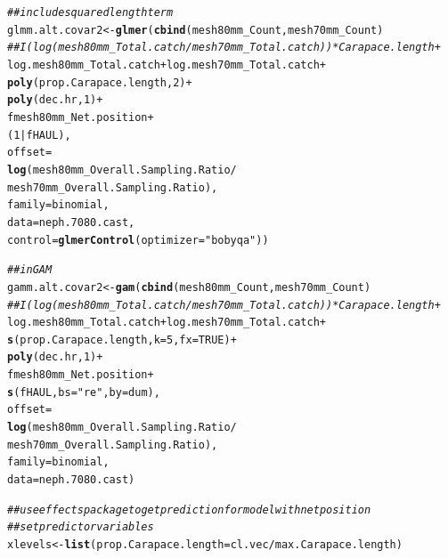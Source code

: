 \documentclass[12pt]{article}\usepackage[]{graphicx}\usepackage[]{color}
\makeatletter
\newcommand{\hlnum}[1]{\textcolor[rgb]{0.686,0.059,0.569}{#1}}%
\newcommand{\hlstr}[1]{\textcolor[rgb]{0.192,0.494,0.8}{#1}}%
\newcommand{\hlcom}[1]{\textcolor[rgb]{0.678,0.584,0.686}{\textit{#1}}}%
\newcommand{\hlopt}[1]{\textcolor[rgb]{0,0,0}{#1}}%
\newcommand{\hlstd}[1]{\textcolor[rgb]{0.345,0.345,0.345}{#1}}%
\newcommand{\hlkwb}[1]{\textcolor[rgb]{0.69,0.353,0.396}{#1}}%
\newcommand{\hlkwc}[1]{\textcolor[rgb]{0.333,0.667,0.333}{#1}}%
\newcommand{\hlkwd}[1]{\textcolor[rgb]{0.737,0.353,0.396}{\textbf{#1}}}%
\newenvironment{kframe}{%
 \def\at@end@of@kframe{}%
 \ifinner\ifhmode%
  \def\at@end@of@kframe{\end{minipage}}%
  \begin{minipage}{\columnwidth}%
 \fi\fi%
 \def\FrameCommand##1{\hskip\@totalleftmargin \hskip-\fboxsep
 \colorbox{shadecolor}{##1}\hskip-\fboxsep
     \hskip-\linewidth \hskip-\@totalleftmargin \hskip\columnwidth}%
 \MakeFramed {\advance\hsize-\width
   \@totalleftmargin\z@ \linewidth\hsize
   \@setminipage}}%
 {\par\unskip\endMakeFramed%
 \at@end@of@kframe}
\newenvironment{knitrout}{}{} %
\makeatother
\begin{document}
\begin{knitrout}
\begin{kframe}
\begin{alltt}
\hlcom{## include squared length term}
\hlstd{glmm.alt.covar2} \hlkwb{<-} \hlkwd{glmer}\hlstd{(}\hlkwd{cbind}\hlstd{(mesh80mm_Count, mesh70mm_Count)} \hlopt{~}
                         \hlcom{##I(log(mesh80mm_Total.catch / mesh70mm_Total.catch)) * Carapace.length +}
                         \hlstd{log.mesh80mm_Total.catch} \hlopt{+} \hlstd{log.mesh70mm_Total.catch} \hlopt{+}
                         \hlkwd{poly}\hlstd{(prop.Carapace.length,} \hlnum{2}\hlstd{)} \hlopt{+}
                         \hlkwd{poly}\hlstd{(dec.hr,} \hlnum{1}\hlstd{)} \hlopt{+}
                         \hlstd{fmesh80mm_Net.position} \hlopt{+}
                         \hlstd{(}\hlnum{1} \hlopt{|} \hlstd{fHAUL),}
                         \hlkwc{offset} \hlstd{=}
                         \hlkwd{log}\hlstd{(mesh80mm_Overall.Sampling.Ratio} \hlopt{/}
                             \hlstd{mesh70mm_Overall.Sampling.Ratio),}
                         \hlkwc{family} \hlstd{= binomial,}
                         \hlkwc{data} \hlstd{= neph.7080.cast,}
                         \hlkwc{control}\hlstd{=}\hlkwd{glmerControl}\hlstd{(}\hlkwc{optimizer}\hlstd{=}\hlstr{"bobyqa"}\hlstd{))}

\hlcom{## in GAM}
\hlstd{gamm.alt.covar2} \hlkwb{<-} \hlkwd{gam}\hlstd{(}\hlkwd{cbind}\hlstd{(mesh80mm_Count, mesh70mm_Count)} \hlopt{~}
                       \hlcom{##I(log(mesh80mm_Total.catch / mesh70mm_Total.catch)) * Carapace.length +}
                       \hlstd{log.mesh80mm_Total.catch} \hlopt{+} \hlstd{log.mesh70mm_Total.catch} \hlopt{+}
                       \hlkwd{s}\hlstd{(prop.Carapace.length,} \hlkwc{k} \hlstd{=} \hlnum{5}\hlstd{,} \hlkwc{fx} \hlstd{=} \hlnum{TRUE}\hlstd{)} \hlopt{+}
                       \hlkwd{poly}\hlstd{(dec.hr,} \hlnum{1}\hlstd{)} \hlopt{+}
                       \hlstd{fmesh80mm_Net.position} \hlopt{+}
                       \hlkwd{s}\hlstd{(fHAUL,} \hlkwc{bs}\hlstd{=}\hlstr{"re"}\hlstd{,} \hlkwc{by} \hlstd{= dum),}
                       \hlkwc{offset} \hlstd{=}
                       \hlkwd{log}\hlstd{(mesh80mm_Overall.Sampling.Ratio} \hlopt{/}
                           \hlstd{mesh70mm_Overall.Sampling.Ratio),}
                       \hlkwc{family} \hlstd{= binomial,}
                       \hlkwc{data} \hlstd{= neph.7080.cast)}

\hlcom{## use effects package to get prediction for model with net position}
\hlcom{## set predictor variables}
\hlstd{xlevels} \hlkwb{<-} \hlkwd{list}\hlstd{(}\hlkwc{prop.Carapace.length} \hlstd{= cl.vec}\hlopt{/}\hlstd{max.Carapace.length)}


\end{alltt}
\end{kframe}
\end{knitrout}
\end{document}
